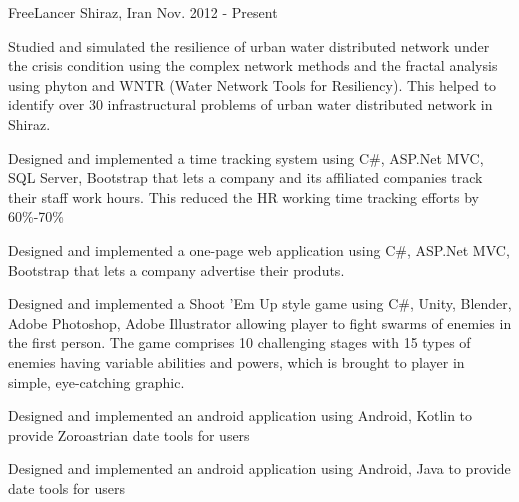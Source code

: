 


\begin{cventries}


\cventry
{} %
{FreeLancer} %
{Shiraz, Iran} %
{Nov. 2012 - Present} %
{ %
\begin{cvitems}
\item {Studied and simulated the resilience of urban water distributed network under the crisis condition using the complex network methods and the fractal analysis using phyton and WNTR (Water Network Tools for Resiliency). This helped to identify over 30 infrastructural problems of urban water distributed network in Shiraz.}
\item {Designed and implemented a time tracking system using C\#, ASP.Net MVC, SQL Server, Bootstrap that lets a company and its affiliated companies track their staff work hours. This reduced the HR working time tracking efforts by 60\%-70\%}
\item {Designed and implemented a one-page web application using C\#, ASP.Net MVC, Bootstrap that lets a company advertise their produts.}
\item {Designed and implemented a Shoot 'Em Up style game using C\#, Unity, Blender, Adobe Photoshop, Adobe Illustrator allowing player to fight swarms of enemies in the first person. The game comprises 10 challenging stages with 15 types of enemies having variable abilities and powers, which is brought to player in simple, eye-catching graphic.}
\item {Designed and implemented an android application using Android, Kotlin to provide Zoroastrian date tools for users}
\item {Designed and implemented an android application using Android, Java to provide date tools for users}
\end{cvitems}
}


\end{cventries}